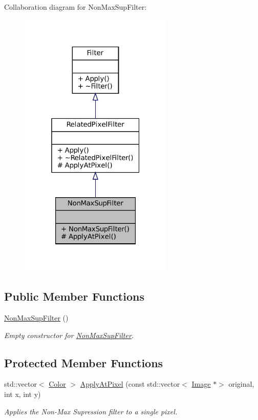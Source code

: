 Collaboration diagram for Non\+Max\+Sup\+Filter\+:\nopagebreak
\begin{figure}[H]
\begin{center}
\leavevmode
\includegraphics[width=208pt]{classNonMaxSupFilter__coll__graph}
\end{center}
\end{figure}
\subsection*{Public Member Functions}
\begin{DoxyCompactItemize}
\item 
\mbox{\label{classNonMaxSupFilter_a6a5ad2f1e7d98dcf8d6c03e02fe7e5d8}} 
\hyperlink{classNonMaxSupFilter_a6a5ad2f1e7d98dcf8d6c03e02fe7e5d8}{Non\+Max\+Sup\+Filter} ()
\begin{DoxyCompactList}\small\item\em Empty constructor for \hyperlink{classNonMaxSupFilter}{Non\+Max\+Sup\+Filter}. \end{DoxyCompactList}\end{DoxyCompactItemize}
\subsection*{Protected Member Functions}
\begin{DoxyCompactItemize}
\item 
std\+::vector$<$ \hyperlink{classColor}{Color} $>$ \hyperlink{classNonMaxSupFilter_a00c4dcab5fe613124051d7a782284df3}{Apply\+At\+Pixel} (const std\+::vector$<$ \hyperlink{classImage}{Image} $\ast$$>$ original, int x, int y)
\begin{DoxyCompactList}\small\item\em Applies the Non-\/\+Max Supression filter to a single pixel. \end{DoxyCompactList}\end{DoxyCompactItemize}


